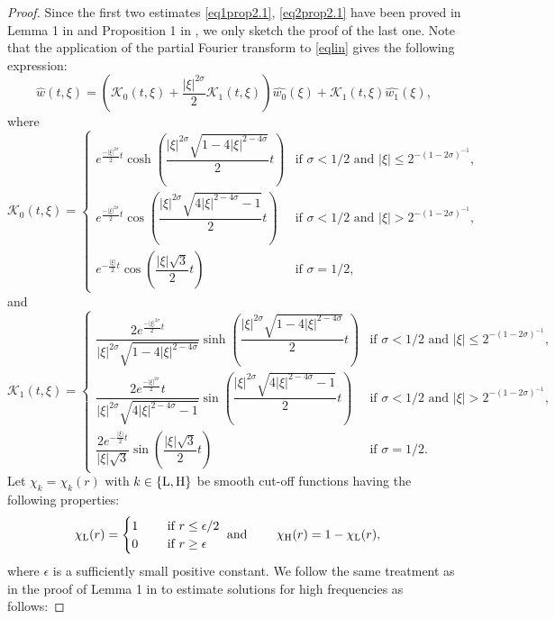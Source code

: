 \documentclass[11pt,reqno]{amsart}
\numberwithin{equation}{section}
\theoremstyle{plain}
\begin{document}
\begin{proof}
    Since the first two estimates \eqref{eq1prop2.1}, \eqref{eq2prop2.1} have been proved in Lemma 1 in \cite{Mat1976} and Proposition 1 in \cite{Dao}, we only sketch the proof of the last one. Note that the application of the partial Fourier transform to \eqref{eqlin} gives the following expression:
    \[
    \widehat{w}(t,\xi)= \left(\mathcal{K}_0(t,\xi)+\frac{|\xi|^{2\sigma}}{2}\mathcal{K}_1(t,\xi)\right)\widehat{w_0}(\xi)+ \mathcal{K}_1(t,\xi)\widehat{w_1}(\xi),
    \]
    where
\[
\mathcal{K}_0(t,\xi)=
\begin{cases}
e^{\frac{-|\xi|^{2 \sigma}}{2} t} \cosh \left(\dfrac{|\xi|^{2 \sigma} \sqrt{1-4|\xi|^{2-4 \sigma}}}{2} t\right) &\text{if }\sigma<1/2\text{ and } |\xi| \leq 2^{-(1-2 \sigma)^{-1}}, \\
e^{\frac{-|\xi|^{2 \sigma}}{2} t} \cos \left(\dfrac{|\xi|^{2 \sigma} \sqrt{4|\xi|^{2-4 \sigma}-1}}{2} t\right) &\text{if }\sigma<1/2 \text{ and } |\xi|>2^{-(1-2 \sigma)^{-1}}, \\
e^{-\frac{|\xi|}{2} t} \cos \left(\dfrac{|\xi|\sqrt{3}}{2} t\right) &\text{if }\sigma = 1/2,
\end{cases}
\]
and
\[
\mathcal{K}_1(t,\xi)=
\begin{cases}
\dfrac{2 e^{\frac{-|\xi|^{2 \sigma}}{2} t}}{|\xi|^{2 \sigma} \sqrt{1-4|\xi|^{2-4\sigma}}} \sinh \left(\dfrac{|\xi|^{2 \sigma} \sqrt{1-4|\xi|^{2-4 \sigma}}}{2} t\right) &\text{if }\sigma<1/2 \text{ and } |\xi| \leq 2^{-(1-2 \sigma)^{-1}}, \\
\dfrac{2 e^{\frac{-|\xi|^{2 \sigma}}{2}} t}{|\xi|^{2 \sigma} \sqrt{4|\xi|^{2-4 \sigma}-1}} \sin \left(\dfrac{|\xi|^{2 \sigma} \sqrt{4|\xi|^{2-4 \sigma}-1}}{2} t\right) &\text{if }\sigma<1/2 \text{ and } |\xi|>2^{-(1-2\sigma)^{-1}},\\
\dfrac{2 e^{-\frac{|\xi|}{2} t}}{|\xi|\sqrt{3}} \sin \left(\dfrac{|\xi|\sqrt{3}}{2} t\right) &\text{if }\sigma = 1/2.
\end{cases}
\]
Let $\chi_k= \chi_k(r)$ with $k\in\{\rm L,H\}$ be smooth cut-off functions having the following properties:
\begin{align*}
&\chi_{\rm L}(r)=
\begin{cases}
1 &\quad \text{ if }r\leq \epsilon/2 \\
0 &\quad \text{ if }r\geq \epsilon
\end{cases}
\text{ and } \qquad
\chi_{\rm H}(r)= 1 -\chi_{\rm L}(r),
\end{align*}
where $\epsilon$ is a sufficiently small positive constant. We follow the same treatment as in the proof of Lemma 1 in \cite{Mat1976} to estimate solutions for high frequencies as follows:

\end{proof}
\end{document}
